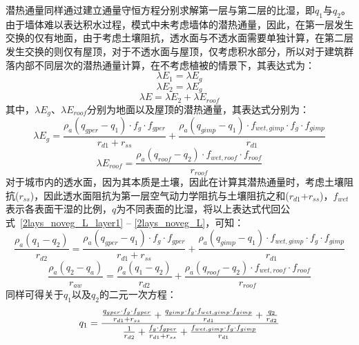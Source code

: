 潜热通量同样通过建立通量守恒方程分别求解第一层与第二层的比湿，即$q_1$与$q_2$。由于墙体难以表达积水过程，模式中未考虑墙体的潜热通量，因此，在第一层发生交换的仅有地面，由于考虑土壤阻抗，透水面与不透水面需要单独计算，在第二层发生交换的则仅有屋顶，对于不透水面与屋顶，仅考虑积水部分，所以对于建筑群落内部不同层次的潜热通量计算，在不考虑植被的情景下，其表达式为：
\begin{equation}\label{2lays_noveg_L_layer1}
    \lambda E_{1} = \lambda E_{g}
\end{equation}
%
\begin{equation}
    \lambda E_{2} = \lambda E_{g}
\end{equation}
%
\begin{equation}\label{2lays_noveg_L}
    \lambda E = \lambda E_{2} + \lambda E_{roof}
\end{equation}
其中，$\lambda E_{g}$、$\lambda E_{roof}$分别为地面以及屋顶的潜热通量，其表达式分别为：
\begin{equation}\label{urban_noveg_Eg}
    \lambda E_{g} = \frac{\rho _a \left( q_{gper}-q_{1} \right) \cdot f_{g} \cdot f_{gper}}{r_{d1}+r_{ss}} + \frac{\rho _a \left( q_{gimp}-q_{1} \right) \cdot f_{wet,gimp} \cdot f_{g} \cdot f_{gimp}}{r_{d1}}
\end{equation}
%
\begin{equation}\label{urban_noveg_Eroof}
    \lambda E_{roof} = \frac{\rho _a \left( q_{roof}-q_{2}\right) \cdot f_{wet,roof} \cdot f_{roof}}{r_{roof}}
\end{equation}
对于城市内的透水面，因为其本质是土壤，因此在计算其潜热通量时，考虑土壤阻抗($r_{ss}$)，因此透水面阻抗为第一层空气动力学阻抗与土壤阻抗之和($r_{d1}$+$r_{ss}$)，$f_{wet}$表示各表面干湿的比例，$q$为不同表面的比湿，将以上表达式代回公式~\ref{2lays_noveg_L_layer1} -- \ref{2lays_noveg_L}，可知：
\begin{equation}
    \frac{\rho _a \left( q_{1}-q_{2}\right)}{r_{d2}} =
    \frac{\rho _a \left( q_{gper}-q_{1}\right) \cdot f_{g} \cdot f_{gper}}{r_{d1}+r_{ss}} + \frac{\rho _a \left( q_{gimp}-q_{1} \right) \cdot f_{wet,gimp} \cdot f_{g} \cdot f_{gimp}}{r_{d1}}
\end{equation}
%
\begin{equation}
    \frac{\rho _a \left( q_{2} - q_a\right)}{r_{aw}} = \frac{\rho _a \left( q_{1} - q_{2}\right)}{r_{d2}} + \frac{\rho _a \left( q_{roof}-q_{2}\right) \cdot f_{wet,roof} \cdot f_{roof}}{r_{roof}}
\end{equation}
同样可得关于$q_{1}$以及$q_{2}$的二元一次方程：
\begin{equation}
    q_{1} = \\
    \frac{\frac{q_{gper} \cdot f_{g} \cdot f_{gper}}{r_{d1} + r_{ss}} + \frac{q_{gimp} \cdot f_{g} \cdot f_{wet,gimp} \cdot f_{gimp}}{r_{d1}} + \frac{q_{2}}{r_{d2}}}{\frac{1}{r_{d2}} + \frac{f_{g} \cdot f_{gper}}{r_{d1} + r_{ss}} + \frac{f_{wet,gimp} \cdot f_{g} \cdot f_{gimp}}{r_{d1}}}
\end{equation}
